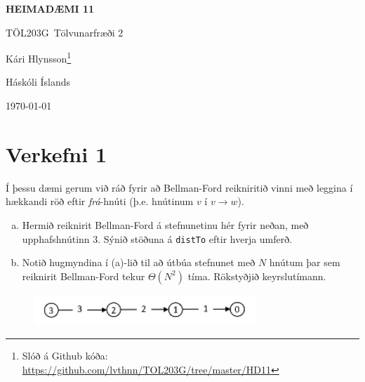 \documentclass[12pt, a4paper, hidelinks]{article}
\newcommand{\doctitle}{\uppercase{Heimadæmi 11}}
\newcommand{\coursename}{Tölvunarfræði 2}
\newcommand{\coursenum}{TÖL203G}
\begin{document}
\thispagestyle{plain}
\centerline{\bfseries\Large\doctitle}
\medskip
\centerline{\large\coursenum\ \coursename}
\bigskip

\centerline{\large Kári Hlynsson\footnote{Slóð á Github kóða: \url{https://github.com/lvthnn/TOL203G/tree/master/HD11}}}
\bigskip
\centerline{Háskóli Íslands}
\medskip
\centerline{\today}

\section*{Verkefni 1}
Í þessu dæmi gerum við ráð fyrir að Bellman-Ford reikniritið vinni með leggina í hækkandi röð eftir \emph{frá}-hnúti (þ.e. hnútinum $v$ í $v \to w$).
\begin{enumerate}[(a)]
    \item Hermið reiknirit Bellman-Ford á stefnunetinu hér fyrir neðan, með upphafshnútinn 3. Sýnið stöðuna á \texttt{distTo} eftir hverja umferð.

    \item Notið hugmyndina í (a)-lið til að útbúa stefnunet með $N$ hnútum þar sem reiknirit Bellman-Ford tekur $\Theta(N^2)$ tíma. Rökstyðjið keyrslutímann.
\end{enumerate}

\begin{figure}[H]
    \centering
    \includegraphics[width=0.75\textwidth]{HD11/pdf/img/V1.png}
    \label{fig:V1}
\end{figure}
\end{document}
